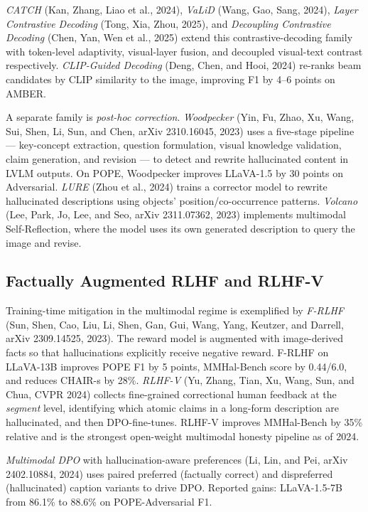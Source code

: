 \emph{CATCH} (Kan, Zhang, Liao et al., 2024), \emph{VaLiD} (Wang, Gao, Sang, 2024), \emph{Layer Contrastive Decoding} (Tong, Xia, Zhou, 2025), and \emph{Decoupling Contrastive Decoding} (Chen, Yan, Wen et al., 2025) extend this contrastive-decoding family with token-level adaptivity, visual-layer fusion, and decoupled visual-text contrast respectively. \emph{CLIP-Guided Decoding} (Deng, Chen, and Hooi, 2024) re-ranks beam candidates by CLIP similarity to the image, improving F1 by 4--6 points on AMBER.

A separate family is \emph{post-hoc correction}. \emph{Woodpecker} (Yin, Fu, Zhao, Xu, Wang, Sui, Shen, Li, Sun, and Chen, arXiv 2310.16045, 2023) uses a five-stage pipeline --- key-concept extraction, question formulation, visual knowledge validation, claim generation, and revision --- to detect and rewrite hallucinated content in LVLM outputs. On POPE, Woodpecker improves LLaVA-1.5 by 30 points on Adversarial. \emph{LURE} (Zhou et al., 2024) trains a corrector model to rewrite hallucinated descriptions using objects' position/co-occurrence patterns. \emph{Volcano} (Lee, Park, Jo, Lee, and Seo, arXiv 2311.07362, 2023) implements multimodal Self-Reflection, where the model uses its own generated description to query the image and revise.

\subsection{Factually Augmented RLHF and RLHF-V}\label{factually-augmented-rlhf-and-rlhf-v}

Training-time mitigation in the multimodal regime is exemplified by \emph{F-RLHF} (Sun, Shen, Cao, Liu, Li, Shen, Gan, Gui, Wang, Yang, Keutzer, and Darrell, arXiv 2309.14525, 2023). The reward model is augmented with image-derived facts so that hallucinations explicitly receive negative reward. F-RLHF on LLaVA-13B improves POPE F1 by 5 points, MMHal-Bench score by 0.44/6.0, and reduces CHAIR-s by 28\%. \emph{RLHF-V} (Yu, Zhang, Tian, Xu, Wang, Sun, and Chua, CVPR 2024) collects fine-grained correctional human feedback at the \emph{segment} level, identifying which atomic claims in a long-form description are hallucinated, and then DPO-fine-tunes. RLHF-V improves MMHal-Bench by 35\% relative and is the strongest open-weight multimodal honesty pipeline as of 2024.

\emph{Multimodal DPO} with hallucination-aware preferences (Li, Lin, and Pei, arXiv 2402.10884, 2024) uses paired preferred (factually correct) and dispreferred (hallucinated) caption variants to drive DPO. Reported gains: LLaVA-1.5-7B from 86.1\% to 88.6\% on POPE-Adversarial F1.

